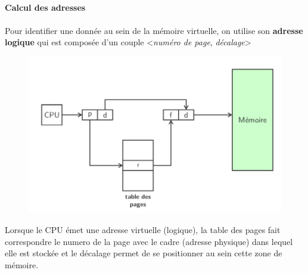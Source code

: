 {\paragraph{Calcul des adresses}
\paragraph{}
Pour identifier une donnée au sein de la mémoire virtuelle, on utilise son \textbf{adresse logique} qui est composée d'un couple <\textit{numéro de page}, \textit{décalage}>

\begin{figure}[!h]
\center\includegraphics[scale=.3]{images/calcul-adresse-pagination}
\end{figure}

Lorsque le CPU émet une adresse virtuelle (logique), la table des pages fait correspondre le numero de la page avec le cadre (adresse physique) dans lequel elle est stockée et le décalage permet de se positionner au sein cette zone de mémoire.
}


\item{}
{}


\item{}
{}